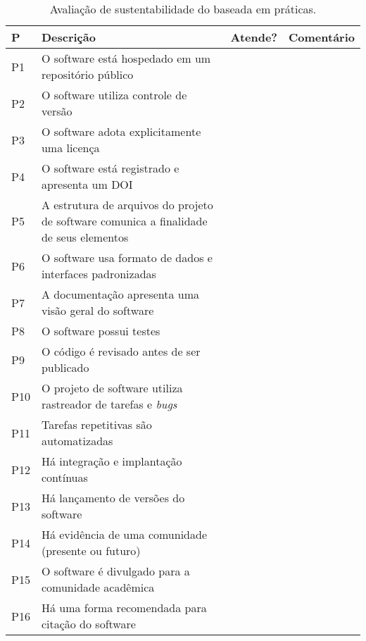 \begin{table}[tbp]
    \caption{Avaliação de sustentabilidade do \RSw baseada em práticas.}
    \centering
    \small
    \begin{tabular}{p{0.65cm}|p{9cm}|c|p{2cm}}
    \hline
       \textbf{P} & \textbf{Descrição} & \textbf{Atende?} & \textbf{Comentário}\\
       \hline
        P1 & O software está hospedado em um repositório público  &  &  \\
        P2 & O software utiliza controle de versão  &  & \\
        P3 & O software adota explicitamente uma licença  &  & \\
        P4 & O software está registrado e apresenta um DOI &  &  \\
        P5 & A estrutura de arquivos do projeto de software comunica a finalidade de seus elementos &  & \\
        P6 & O software usa formato de dados e interfaces padronizadas  &  & \\
        P7 & A documentação apresenta uma visão geral do software &  &  \\
        P8 & O software possui testes &  &  \\
        P9 & O código é revisado antes de ser publicado  &  &  \\
        P10 & O projeto de software utiliza rastreador de tarefas e \textit{bugs}  &  &  \\
        P11 & Tarefas repetitivas são automatizadas  &  & \\
        P12 & Há integração e implantação contínuas  &  & \\
        P13 & Há lançamento de versões do software &  & \\
        P14 & Há evidência de uma comunidade (presente ou futuro) &  &  \\ 
        P15 & O software é divulgado para a comunidade acadêmica  &  & \\
        P16 & Há uma forma recomendada para citação do software  &  & \\
    \hline
    \end{tabular}
    \label{tab:ssi:criteria:template}
\end{table}
